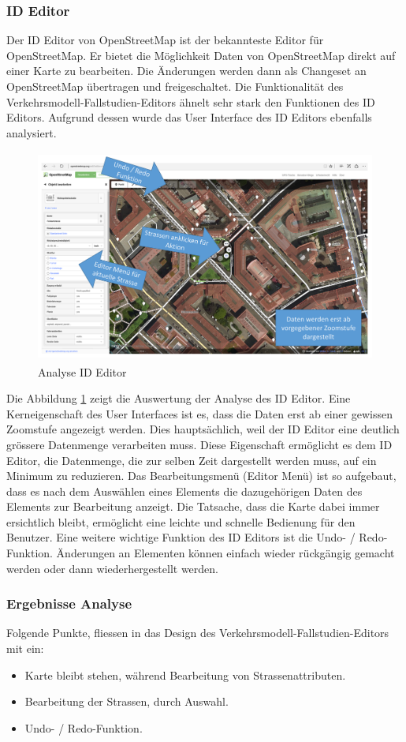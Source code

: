 \subsubsection{ID Editor}
Der ID Editor von OpenStreetMap ist der bekannteste Editor für OpenStreetMap. Er bietet die Möglichkeit Daten von OpenStreetMap direkt auf einer Karte zu bearbeiten. Die Änderungen werden dann als Changeset an OpenStreetMap übertragen und freigeschaltet. Die Funktionalität des Verkehrsmodell-Fallstudien-Editors ähnelt sehr stark den Funktionen des ID Editors. Aufgrund dessen wurde das User Interface des ID Editors ebenfalls analysiert.
\begin{figure}[H]
\centering
\includegraphics[height=7cm]{images/AnalyseIDEditor.png}
\caption{Analyse ID Editor}
\label{fig:ideditor}
\end{figure}
\noindent
Die Abbildung \ref{fig:ideditor} zeigt die Auswertung der Analyse des ID Editor. Eine Kerneigenschaft des User Interfaces ist es, dass die Daten erst ab einer gewissen Zoomstufe angezeigt werden. Dies hauptsächlich, weil der ID Editor eine deutlich grössere Datenmenge verarbeiten muss. Diese Eigenschaft ermöglicht es dem ID Editor, die Datenmenge, die zur selben Zeit dargestellt werden muss, auf ein Minimum zu reduzieren. Das Bearbeitungsmenü (Editor Menü) ist so aufgebaut, dass es nach dem Auswählen eines Elements die dazugehörigen Daten des Elements zur Bearbeitung anzeigt. Die Tatsache, dass die Karte dabei immer ersichtlich bleibt, ermöglicht eine leichte und schnelle Bedienung für den Benutzer. Eine weitere wichtige Funktion des ID Editors ist die Undo- / Redo-Funktion. Änderungen an Elementen können einfach wieder rückgängig gemacht werden oder dann wiederhergestellt werden.
\subsubsection*{Ergebnisse Analyse}
Folgende Punkte, fliessen in das Design des Verkehrsmodell-Fallstudien-Editors mit ein:
\begin{itemize}
\itemsep0em
\item Karte bleibt stehen, während Bearbeitung von Strassenattributen.
\item Bearbeitung der Strassen, durch Auswahl.
\item Undo- / Redo-Funktion.
\end{itemize}
\newpage
